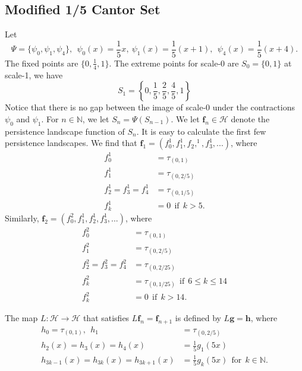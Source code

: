 \documentclass [52pt] {article}
\newcommand{\N}{\mathbb{N}}
\newcommand{\Hil}{\mathcal{H}}
\begin{document}
\subsection{Modified 1/5 Cantor Set}

Let 
\[\Psi = \{\psi_0,\psi_1,\psi_4\},\:\:\psi_0(x) = \frac{1}{5}x,\:\psi_1(x) = \frac{1}{5}(x+1),\:\:\psi_4(x) = \frac{1}{5}(x+4).\]
The fixed points are $\{0,\frac{1}{4},1\}$.  The extreme points for scale-0 are $S_0=\{0,1\}$ at scale-1, we have
\[S_1=\left\{0,\frac{1}{5}, \frac{2}{5},\frac{4}{5},1\right\}\]
Notice that there is no gap between the image of scale-0 under the contractions $\psi_0$ and $\psi_1$.  For $n\in\N$, we let $S_n =\Psi( S_{n-1})$.  We let $\mathbf{f}_n\in\Hil$ denote the persistence landscape function of $S_n$.  It is easy to calculate the first few persistence landscapes.  We find that $\mathbf{f}_1 = (f_0^1, f_1^1,f_2,^1,f_3^1,...)$, where
\[\begin{split}
f_0^1 &= \tau_{(0,1)}\\
f_1^1 &= \tau_{(0,2/5)}\\
f_2^1=f_3^1=f_4^1 &= \tau_{(0,1/5)}\\
f_k^1 &=0\:\:\text{if}\:\: k>5.
\end{split}\]
Similarly, $\mathbf{f}_2 = (f_0^2,f_1^1,f_2^1,f_3^1,...)$, where
\[\begin{split}
f_0^2 &= \tau_{(0,1)}\\
f_1^2 &= \tau_{(0,2/5)}\\
f_2^2=f_3^2=f_4^2 &= \tau_{(0,2/25)}\\
f_k^2 &=\tau_{(0,1/25)}\:\:\text{if}\:\: 6\le k\le 14\\
f_k^2 & = 0\:\:\text{if}\:\:k>14.
\end{split}\]

The map $L:\Hil\to\Hil$ that satisfies $L\mathbf{f}_n = \mathbf{f}_{n+1}$ is defined by $L\mathbf{g} = \mathbf{h}$, where
\[\begin{split}
h_0 = \tau_{(0,1)},\:\: h_1 &= \tau_{(0,2/5)}\\
h_2(x) = h_3(x) = h_4(x) &= \frac{1}{5}g_1(5x)\\
h_{3k-1}(x) = h_{3k}(x) = h_{3k+1}(x) &= \frac{1}{5}g_k(5x)\:\:\text{for}\:\:k\in\mathbb{N}.
\end{split}\]
\end{document}
